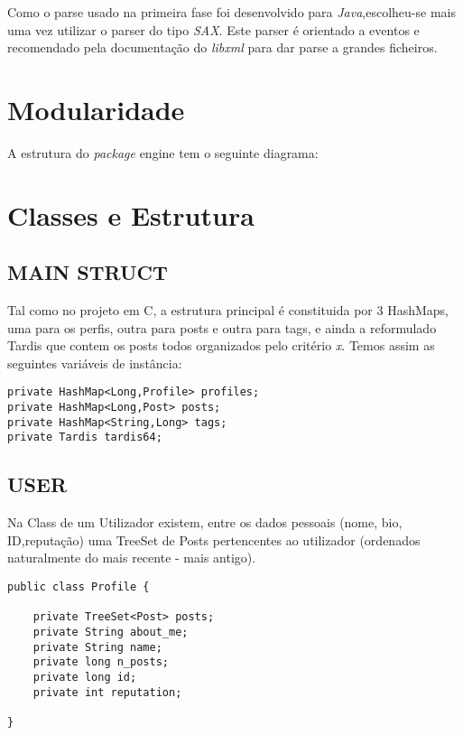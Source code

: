 \documentclass[letterpaper, 10 pt, conference]{IEEEtran}  %
\begin{document}
Como o parse usado na primeira fase foi desenvolvido para \textit{Java},escolheu-se mais uma vez utilizar o parser do tipo \textit{SAX}. Este parser é orientado a eventos e recomendado pela documentação do \textit{libxml} para dar parse a grandes ficheiros.


\section{Modularidade}
A estrutura do \textit{package} engine tem o seguinte diagrama:




\section{Classes e Estrutura}

\subsection{MAIN STRUCT}
Tal como no projeto em C, a estrutura principal é constituida por 3 HashMaps, uma para os perfis, outra para posts e outra para tags, e ainda a reformulado Tardis que contem os posts todos organizados pelo critério \textit{x}.
\newline
Temos assim as seguintes variáveis de instância:
\begin{lstlisting}
private HashMap<Long,Profile> profiles;
private HashMap<Long,Post> posts;
private HashMap<String,Long> tags;
private Tardis tardis64;
\end{lstlisting}

\subsection{USER}

Na Class de um Utilizador existem, entre os dados pessoais (nome, bio, ID,reputação) uma TreeSet de Posts
pertencentes ao utilizador (ordenados naturalmente do mais recente - mais antigo).

\begin{lstlisting}
public class Profile {

    private TreeSet<Post> posts;
    private String about_me;
    private String name;
    private long n_posts;
    private long id;
    private int reputation;

}
\end{lstlisting}
\end{document}
